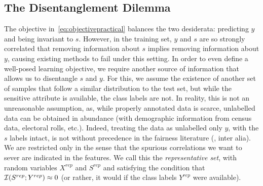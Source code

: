 \subsection{The Disentanglement Dilemma}
%
The objective in~\eqref{eq:objectivepractical} balances the two desiderata: predicting $y$ and
being invariant to $s$.
%
However, in the training set, $y$ and $s$ are so strongly correlated that removing information
about $s$ implies removing information about $y$, causing existing methods to fail under this
setting.
In order to even define a well-posed learning objective, we require another source of information that
allows us to disentangle $s$ and $y$.
%
For this, we assume the existence of another set of samples that follow a similar distribution to
the test set, but while the sensitive attribute is available, the class labels are not. 
%
In reality, this is not an unreasonable assumption, as, while properly annotated data is scarce,
unlabelled data can be obtained in abundance (with demographic information from census data,
electoral rolls, etc.).
%
Indeed, treating the data as unlabelled only \wrt{} \(y\), with the $s$ labels intact, is not
without precedence in the fairness literature (\citealp{wick2019unlocking, creager2019flexibly}, inter alia).
%
We are restricted only in the sense that the spurious correlations we want to sever are indicated
in the features.
%
We call this the \emph{representative set}, with random variables $X^{rep}$ and \( S^{rep} \) and
satisfying the condition that \( {\mathcal{I}}(S^{rep}; Y^{rep}) \approx 0 \) (or rather, it would if the
class labels \( Y^{rep} \) were available).

